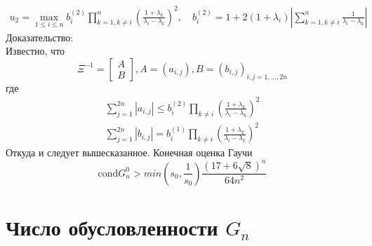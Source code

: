 \begin{eqnarray}
u_2=\max\limits_{1\leq i \leq n}b^{(2)}_i
\prod\limits_{k=1,k\not = i}^{n}
\left(
\frac{1+\lambda_k}
{\lambda_i-\lambda_k}\right)^2, \quad
b_i^{(2)}=
1+2(1+\lambda_i)
\left|
\sum\limits_{k=1,k\not=i}^{n}
{
\frac{1}
{\lambda_i-\lambda_k}
}
\right|
\end{eqnarray}
\rm
Доказательство: \\
Известно, что
\begin{equation}
\Xi^{-1}=\left[
\begin{array} {ccccc}
A \\
B
\end{array}
\right],A=(a_{i,j}),B=(b_{i,j})_{i,j=1,\ldots,2n}
\end{equation}
где
\begin{eqnarray}
\sum\limits_{j=1}^{2n}{\left| a_{i,j}\right|} \leq
b^{(2)}_i\prod\limits_{k\not= i}{\left(
\frac{1+\lambda_k}{\lambda_i-\lambda_k}\right)^2} \nonumber \\
\sum\limits_{j=1}^{2n}{\left| b_{i,j}\right|} =
 b^{(1)}_i\prod\limits_{k\not= i}{\left(
\frac{1+\lambda_k}{\lambda_i-\lambda_k}\right)^2} \nonumber
\end{eqnarray}
Откуда и следует вышесказанное.
Конечная оценка Гаучи
\begin{equation}
\mbox{cond}G_n^{0}>min(s_0,\frac{1}{s_0})\frac{(17+6\sqrt{8})^n}{64n^2}
\end{equation}

\section{Число обусловленности $G_n$}

